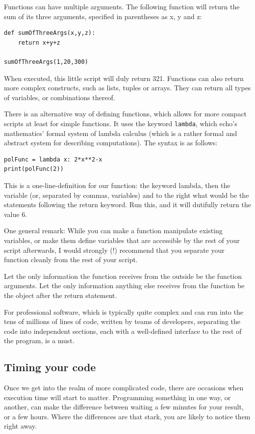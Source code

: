 \documentclass[twocolumn,apj]{openjournal}
\begin{document}
Functions can have multiple arguments. The following function will return the sum of its three arguments, specified in parentheses as x, y and z:
\begin{lstlisting}
def sumOfThreeArgs(x,y,z):
	return x+y+z
	
sumOfThreeArgs(1,20,300)
\end{lstlisting}
When executed, this little script will duly return 321. Functions can also return more complex constructs, such as lists, tuples or arrays. They can return all types of variables, or combinations thereof.

There is an alternative way of defining functions, which allows for more compact scripts at least for simple functions. It uses the keyword \verb|lambda|, which echo's mathematics' formal system of lambda calculus (which is a rather formal and abstract system for describing computations). The syntax is as follows:
\begin{lstlisting}
polFunc = lambda x: 2*x**2-x
print(polFunc(2))
\end{lstlisting}
This is a one-line-definition for our function: the keyword lambda, then the variable (or, separated by commas, variables) and to the right what would be the statements following the return keyword. Run this, and it will dutifully return the value 6.

One general remark: While you can make a function manipulate existing variables, or make them define variables that are accessible by the rest of your script afterwards, I would strongly (!) recommend that you separate your function cleanly from the rest of your script. 

Let the only information the function receives from the outside be the function arguments. Let the only information anything else receives from the function be the object after the return statement. 

For professional software, which is typically quite complex and can run into the tens of millions of lines of code, written by teams of developers, separating the code into independent sections, each with a well-defined interface to the rest of the program, is a must.

\subsection{Timing your code}
\label{Timing}

Once we get into the realm of more complicated code, there are occasions when execution time will start to matter. Programming something in one way, or another, can make the difference between waiting a few minutes for your result, or a few hours. Where the differences are that stark, you are likely to notice them right away.
\end{document}
